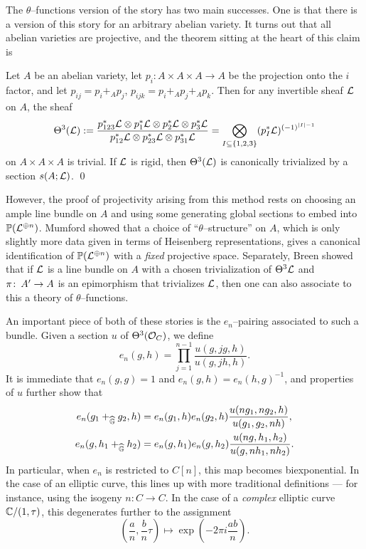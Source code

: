The $\theta$--functions version of the story has two main successes.  One is that there is a version of this story for an arbitrary abelian variety.  It turns out that all abelian varieties are projective, and the theorem sitting at the heart of this claim is
\begin{corollary}\label{Theta3IsTrivial}
Let $A$ be an abelian variety, let $p_i: A \times A \times A \to A$ be the projection onto the $i${\th} factor, and let $p_{ij} = p_i +_A p_j$, $p_{ijk} = p_i +_A p_j +_A p_k$.  Then for any invertible sheaf $\mathcal{L}$ on $A$, the sheaf \[\Theta^3(\mathcal{L}) := \frac{p_{123}^* \mathcal{L} \otimes p_1^* \mathcal{L} \otimes p_2^* \mathcal{L} \otimes p_3^* \mathcal{L}}{p_{12}^* \mathcal{L} \otimes p_{23}^* \mathcal{L} \otimes p_{31}^* \mathcal{L}} = \bigotimes_{I \subseteq \{1, 2, 3\}} (p_I^* \mathcal{L})^{(-1)^{|I| - 1}}\] on $A \times A \times A$ is trivial.  If $\mathcal{L}$ is rigid, then $\Theta^3(\mathcal{L})$ is canonically trivialized by a section $s(A; \mathcal{L})$. \qed
\end{corollary}
\noindent However, the proof of projectivity arising from this method rests on choosing an ample line bundle on $A$ and using some generating global sections to embed into $\mathbb{P}(\mathcal{L}^{\oplus n})$.  Mumford showed that a choice of ``$\theta$--structure'' on $A$, which is only slightly more data given in terms of Heisenberg representations, gives a canonical identification of $\mathbb{P}(\mathcal{L}^{\oplus n})$ with a \emph{fixed} projective space.  Separately, Breen showed that if $\mathcal{L}$ is a line bundle on $A$ with a chosen trivialization of $\Theta^3 \mathcal{L}$ and $\pi\colon\thinspace A' \to A$ is an epimorphism that trivializes $\mathcal{L}$, then one can also associate to this a theory of $\theta$--functions.




An important piece of both of these stories is the $e_n$--pairing associated to such a bundle.  Given a section $u$ of $\Theta^3(\mathcal{O}_C)$, we define \[e_n(g, h) = \prod_{j=1}^{n-1} \frac{u(g, jg, h)}{u(g, jh, h)}.\]  It is immediate that $e_n(g, g) = 1$ and $e_n(g, h) = e_n(h, g)^{-1}$, and properties of $u$ further show that
\begin{align*}
e_n(g_1 +_{\widehat{\mathbb G}} g_2, h) & = e_n(g_1, h) e_n(g_2, h) \frac{u(ng_1, ng_2, h)}{u(g_1, g_2, nh)}, \\
e_n(g, h_1 +_{\widehat{\mathbb G}} h_2) & = e_n(g, h_1) e_n(g, h_2) \frac{u(ng, h_1, h_2)}{u(g, nh_1, nh_2)}.
\end{align*}
In particular, when $e_n$ is restricted to $C[n]$, this map becomes biexponential.  In the case of an elliptic curve, this lines up with more traditional definitions --- for instance, using the isogeny $n: C \to C$.  In the case of a \emph{complex} elliptic curve $\mathbb{C} / (1, \tau)$, this degenerates further to the assignment \[\left( \frac{a}{n}, \frac{b}{n} \tau \right) \mapsto \exp\left(-2\pi i \frac{ab}{n}\right).\]



